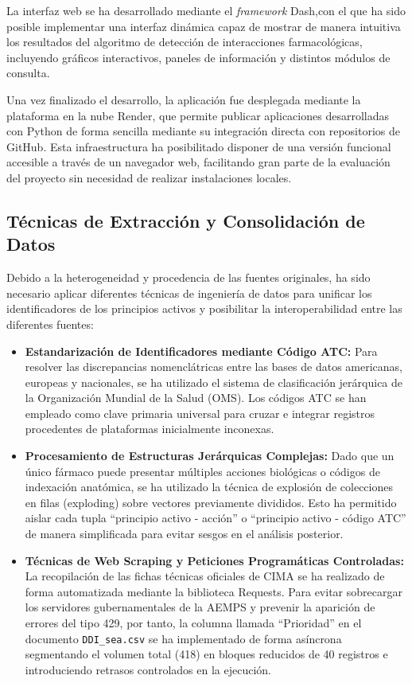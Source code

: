 La interfaz web se ha desarrollado mediante el \textit{framework} Dash,con el que ha sido posible implementar una 
interfaz dinámica capaz de mostrar de manera intuitiva los resultados del 
algoritmo de detección de interacciones farmacológicas, incluyendo gráficos interactivos, paneles de información y 
distintos módulos de consulta.

Una vez finalizado el desarrollo, la aplicación fue desplegada mediante la plataforma en la nube Render, que permite 
publicar aplicaciones desarrolladas con Python de forma sencilla mediante su integración directa con repositorios 
de GitHub. Esta infraestructura ha posibilitado disponer de una versión funcional accesible a través de un navegador 
web, facilitando gran parte de la evaluación del proyecto sin necesidad de realizar instalaciones locales.

\subsection{Técnicas de Extracción y Consolidación de Datos}
Debido a la heterogeneidad y procedencia de las fuentes originales, ha sido necesario aplicar diferentes técnicas de ingeniería de datos para unificar los identificadores de los principios activos y posibilitar la interoperabilidad entre las diferentes fuentes:

\begin{itemize}
    \item \textbf{Estandarización de Identificadores mediante Código ATC:} Para resolver las discrepancias nomenclátricas entre las bases de datos americanas, europeas y nacionales, se ha utilizado el sistema de clasificación jerárquica de la Organización Mundial de la Salud (OMS). Los códigos ATC se han empleado como clave primaria universal para cruzar e integrar registros procedentes de plataformas inicialmente inconexas.
    \item \textbf{Procesamiento de Estructuras Jerárquicas Complejas:} Dado que un único fármaco puede presentar múltiples acciones biológicas o códigos de indexación anatómica, se ha utilizado la técnica de explosión de colecciones en filas (exploding) sobre vectores previamente divididos. Esto ha permitido aislar cada tupla ``principio activo - acción''  o ``principio activo - código ATC''  de manera simplificada para evitar sesgos en el análisis posterior.
    \item \textbf{Técnicas de Web Scraping y Peticiones Programáticas Controladas:} La recopilación de las fichas técnicas oficiales de CIMA se ha realizado de forma automatizada mediante la biblioteca Requests. Para evitar sobrecargar los servidores gubernamentales de la AEMPS y prevenir la aparición de errores del tipo 429, por tanto, la columna llamada ``Prioridad'' en el documento \texttt{DDI\_sea.csv} se ha implementado de forma asíncrona segmentando el volumen total (418) en bloques reducidos de 40 registros e introduciendo retrasos controlados en la ejecución.
\end{itemize}


